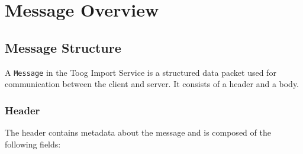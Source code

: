 \documentclass{memoir}
\begin{document}
	\section{Message Overview}
	
	\subsection{Message Structure}
	A \texttt{Message} in the Toog Import Service is a structured data packet used for communication between the client and server. It consists of a header and a body.
	
	\subsubsection{Header}
	The header contains metadata about the message and is composed of the following fields:
\end{document}
